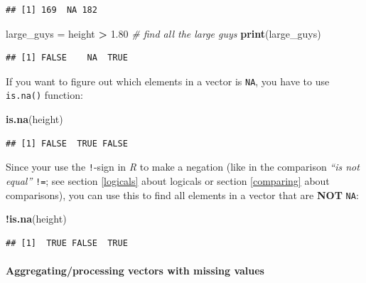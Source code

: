 \documentclass[
]{scrartcl}
\newenvironment{Shaded}{\begin{snugshade}}{\end{snugshade}}
\newcommand{\CommentTok}[1]{\textcolor[rgb]{0.56,0.35,0.01}{\textit{#1}}}
\newcommand{\FloatTok}[1]{\textcolor[rgb]{0.00,0.00,0.81}{#1}}
\newcommand{\FunctionTok}[1]{\textcolor[rgb]{0.13,0.29,0.53}{\textbf{#1}}}
\newcommand{\NormalTok}[1]{#1}
\newcommand{\OtherTok}[1]{\textcolor[rgb]{0.56,0.35,0.01}{#1}}
\newcommand{\SpecialCharTok}[1]{\textcolor[rgb]{0.81,0.36,0.00}{\textbf{#1}}}
\begin{document}
\begin{verbatim}
## [1] 169  NA 182
\end{verbatim}

\begin{Shaded}
\begin{Highlighting}[]
\NormalTok{large\_guys }\OtherTok{=}\NormalTok{ height }\SpecialCharTok{\textgreater{}} \FloatTok{1.80}  \CommentTok{\# find all the large guys}
\FunctionTok{print}\NormalTok{(large\_guys)}
\end{Highlighting}
\end{Shaded}

\begin{verbatim}
## [1] FALSE    NA  TRUE
\end{verbatim}

If you want to figure out which elements in a vector is \texttt{NA}, you have to use \texttt{is.na()} function:

\begin{Shaded}
\begin{Highlighting}[]
\FunctionTok{is.na}\NormalTok{(height)}
\end{Highlighting}
\end{Shaded}

\begin{verbatim}
## [1] FALSE  TRUE FALSE
\end{verbatim}

Since your use the \texttt{!}-sign in \emph{R} to make a negation (like in the comparison \emph{``is not equal''} \texttt{!=}; see section \ref{logicals} about logicals or section \ref{comparing} about comparisons), you can use this to find all elements in a vector that are \textbf{NOT} \texttt{NA}:

\begin{Shaded}
\begin{Highlighting}[]
\SpecialCharTok{!}\FunctionTok{is.na}\NormalTok{(height)}
\end{Highlighting}
\end{Shaded}

\begin{verbatim}
## [1]  TRUE FALSE  TRUE
\end{verbatim}

\paragraph*{Aggregating/processing vectors with missing values}\label{aggregatingprocessing-vectors-with-missing-values}
\end{document}
